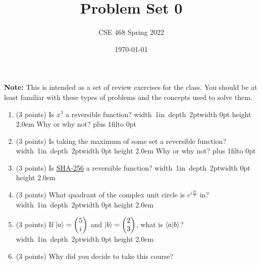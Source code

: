 \documentclass[12pt]{article}
\title{Problem Set 0}
\author{CSE 468 Spring 2022}
\date{\today}
\newcommand{\Blank}{\mbox{\hskip 4pt\vrule width 1in depth 2pt}\vrule width 0pt height 2.0em}
\def\DefaultSpace{1in}
\newcommand{\LeaveSpace}[1][\DefaultSpace]{%
\vskip #1 plus 1fil\relax\hbox to 0pt{\hss} %
}
\begin{document}
\maketitle

\noindent \textbf{Note:} This is intended as a set of review exercises for the class. You should be at least familiar with these types of problems and the concepts used to solve them.

\begin{enumerate}[font=\bfseries]
    \item (3 points) Is $x^3$ a reversible function? \Blank{} Why or why not? \LeaveSpace[0.5in]
    \item (3 points) Is taking the maximum of some set a reversible function? \Blank{} Why or why not?\LeaveSpace{}
    \item (3 points) Is \href{https://en.wikipedia.org/wiki/SHA-2}{SHA-256} a reversible function? \Blank{} 
    \item (3 points) What quadrant of the complex unit circle is $e^{i\frac{3\pi}{4}}$ in?\Blank{}
    \item (3 points) If $\ket{a} = \begin{pmatrix}5 \\ i \end{pmatrix}$ and $\ket{b} = \begin{pmatrix}2 \\ 3 \end{pmatrix}$, what is $\braket{a|b}$?\Blank{}
    \item (3 points) Why did you decide to take this course? \newline
    
\end{enumerate}
\end{document}
